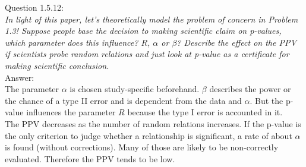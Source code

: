 
Question 1.5.12:\\	
\textsl{In light of this paper, let's theoretically model the problem of concern in Problem 1.3! Suppose people base the decision to making scientific claim on p-values, which parameter does this influence? $R$, $\alpha$ or $\beta$? Describe the effect on the PPV if scientists probe random relations and just look at p-value as a certificate for making scientific conclusion.}\\

Answer:\\

The parameter $\alpha$ is chosen study-specific beforehand. $\beta$ describes the power or the chance of a type II error and is dependent from the data and $\alpha$. But the p-value influences the parameter $R$ because the type I error is accounted in it.\\

The PPV decreases as the number of random relations increases. If the p-value is the only criterion to judge whether a relationship is significant, a rate of about $\alpha$ is found (without corrections). Many of those are likely to be non-correctly evaluated. Therefore the PPV tends to be low.\\
